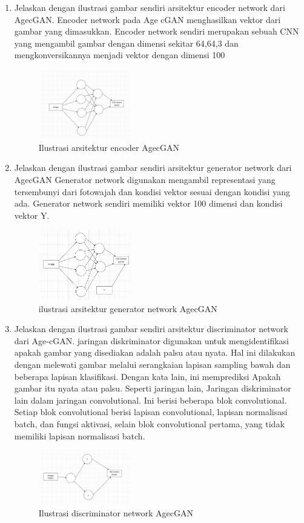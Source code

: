 \begin{enumerate}
	\item Jelaskan dengan ilustrasi gambar sendiri arsitektur encoder network dari AgecGAN.
	\hfill\break
	Encoder network pada Age cGAN menghasilkan vektor dari gambar yang dimasukkan. Encoder network sendiri merupakan sebuah CNN yang mengambil gambar dengan dimensi sekitar 64,64,3 dan mengkonversikannya menjadi vektor dengan dimensi 100
    \begin{figure}[H]
        \centering
            \includegraphics[width=4cm]{figures/1174096/tugas9/teori3.PNG}
            \caption{Ilustrasi arsitektur encoder AgecGAN}
        \end{figure}

	\item Jelaskan dengan ilustrasi gambar sendiri arsitektur generator network dari AgecGAN
	\hfill\break
	Generator network digunakan mengambil representasi yang tersembunyi dari fotowajah dan kondisi vektor sesuai dengan kondisi yang ada. Generator network sendiri memiliki vektor 100 dimensi dan kondisi vektor Y. 
    \begin{figure}[H]
	\centering
		\includegraphics[width=4cm]{figures/1174096/tugas9/teori4.PNG}
		\caption{ilustrasi arsitektur generator network AgecGAN}
	\end{figure}

	\item Jelaskan dengan ilustrasi gambar sendiri arsitektur discriminator network dari Age-cGAN.
	\hfill\break
	jaringan diskriminator digunakan untuk mengidentifikasi apakah gambar yang disediakan adalah palsu atau nyata. Hal ini dilakukan dengan melewati gambar melalui serangkaian lapisan sampling bawah dan beberapa lapisan klasifikasi. Dengan kata lain, ini memprediksi Apakah gambar itu nyata atau palsu. Seperti jaringan lain, Jaringan diskriminator lain dalam jaringan convolutional. Ini berisi beberapa blok convolutional. Setiap blok convolutional berisi lapisan convolutional, lapisan normalisasi batch, dan fungsi aktivasi, selain blok convolutional pertama, yang tidak memiliki lapisan normalisasi batch. 
	\begin{figure}[H]
	\centering
		\includegraphics[width=4cm]{figures/1174096/tugas9/teori5.PNG}
		\caption{Ilustrasi discriminator network AgecGAN}
	\end{figure}


\end{enumerate}
